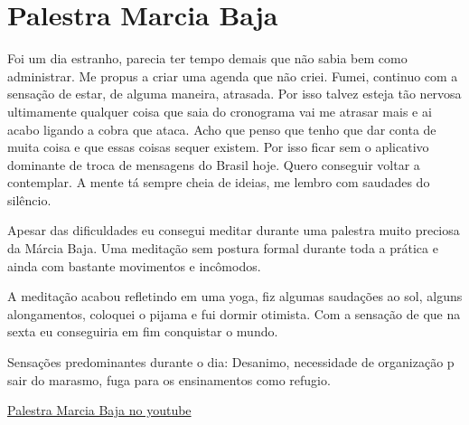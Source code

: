 \chapter{Palestra Marcia Baja}\label{capitulo4}

Foi um dia estranho, parecia ter tempo demais que não sabia bem como administrar. Me propus a criar uma agenda que não criei. Fumei, continuo com a sensação de estar, de alguma maneira, atrasada. Por isso talvez esteja tão nervosa ultimamente qualquer coisa que saia do cronograma vai me atrasar mais e ai acabo ligando a cobra que ataca.
Acho que penso que tenho que dar conta de muita coisa e que essas coisas sequer existem. Por isso ficar sem o aplicativo dominante de troca de mensagens do Brasil hoje.
Quero conseguir voltar a contemplar. A mente tá sempre cheia de ideias, me lembro com saudades do silêncio.

Apesar das dificuldades eu consegui meditar durante uma palestra muito preciosa da Márcia Baja. Uma meditação sem  postura formal durante toda a prática e ainda com bastante movimentos e incômodos. 

A meditação acabou refletindo em uma yoga, fiz algumas saudações ao sol, alguns alongamentos, coloquei o pijama e fui dormir otimista. Com a sensação de que na sexta eu conseguiria em fim conquistar o mundo.

Sensações predominantes durante o dia: Desanimo, necessidade de organização p sair do marasmo, fuga para os ensinamentos como refugio.


\href{https://www.youtube.com/watch?v=WCxLdFbKu0w}{Palestra Marcia Baja no youtube}